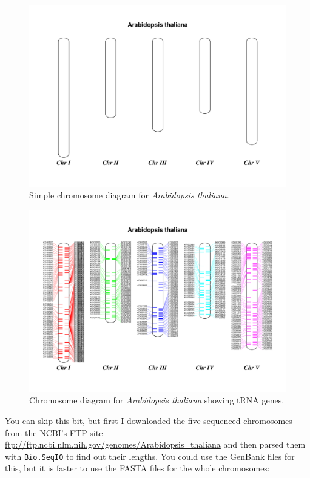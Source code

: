 \documentclass{report}
\begin{document}
\begin{latexonly}
\begin{figure}[p]
\centering
\includegraphics[scale=0.45]{images/simple_chrom.pdf}
\caption{Simple chromosome diagram for \textit{Arabidopsis thaliana}.}
\label{fig:simplechromosome}
\end{figure}
\begin{figure}[p]
\centering
\includegraphics[scale=0.45]{images/tRNA_chrom.pdf}
\caption{Chromosome diagram for \textit{Arabidopsis thaliana} showing tRNA genes.}
\label{fig:trnachromosome}
\end{figure}
\end{latexonly}

You can skip this bit, but first I downloaded the five sequenced chromosomes
from the NCBI's FTP site
\url{ftp://ftp.ncbi.nlm.nih.gov/genomes/Arabidopsis_thaliana} and then parsed
them with \verb|Bio.SeqIO| to find out their lengths.  You could use the
GenBank files for this, but it is faster to use the FASTA files for the
whole chromosomes:
\end{document}
